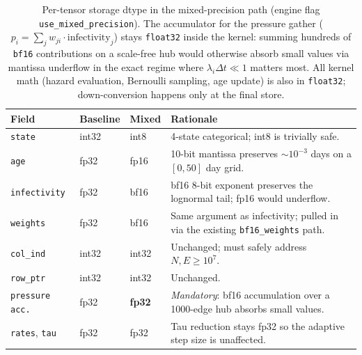 \begin{table}[H]
\caption{Per-tensor storage dtype in the mixed-precision path (engine flag \texttt{use\_mixed\_precision}). The accumulator for the pressure gather ($p_i = \sum_j w_{ji} \cdot \mathrm{infectivity}_j$) stays \texttt{float32} inside the kernel: summing hundreds of \texttt{bf16} contributions on a scale-free hub would otherwise absorb small values via mantissa underflow in the exact regime where $\lambda_i \Delta t \ll 1$ matters most. All kernel math (hazard evaluation, Bernoulli sampling, age update) is also in \texttt{float32}; down-conversion happens only at the final store.}
\label{tab:mixed_precision_dtypes}
\centering
\begin{tabular*}{\linewidth}{@{\extracolsep{\fill}}lllp{}@{}}
\toprule
\textbf{Field} & \textbf{Baseline} & \textbf{Mixed} & \textbf{Rationale} \\
\midrule
\texttt{state}        & int32    & int8     & 4-state categorical; int8 is trivially safe.                             \\
\texttt{age}          & fp32     & fp16     & 10-bit mantissa preserves $\sim\!10^{-3}$ days on a $[0, 50]$ day grid.  \\
\texttt{infectivity}  & fp32     & bf16     & bf16 8-bit exponent preserves the lognormal tail; fp16 would underflow. \\
\texttt{weights}      & fp32     & bf16     & Same argument as infectivity; pulled in via the existing \texttt{bf16\_weights} path. \\
\texttt{col\_ind}     & int32    & int32    & Unchanged; must safely address $N, E \geq 10^7$.                          \\
\texttt{row\_ptr}     & int32    & int32    & Unchanged.                                                                 \\
\texttt{pressure acc.}& fp32     & \textbf{fp32} & \emph{Mandatory}: bf16 accumulation over a 1000-edge hub absorbs small values. \\
\texttt{rates}, \texttt{tau}  & fp32     & fp32     & Tau reduction stays fp32 so the adaptive step size is unaffected.         \\
\bottomrule
\end{tabular*}
\end{table}

